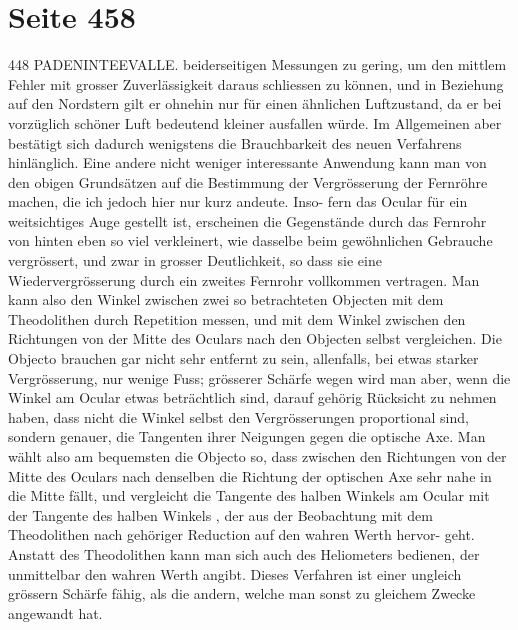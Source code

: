 \documentclass[10pt,a4paper]{article}
\begin{document}
\newpage
\section*{Seite 458}

448  PADENINTEEVALLE.
beiderseitigen  Messungen  zu  gering,  um  den  mittlem  Fehler  mit  grosser  Zuverlässigkeit  daraus  schliessen
zu  können,  und  in  Beziehung  auf  den  Nordstern  gilt  er  ohnehin  nur  für  einen  ähnlichen  Luftzustand,
da  er  bei  vorzüglich  schöner  Luft  bedeutend  kleiner  ausfallen  würde.  Im  Allgemeinen  aber  bestätigt
sich  dadurch  wenigstens  die  Brauchbarkeit  des  neuen  Verfahrens  hinlänglich.
Eine  andere  nicht  weniger  interessante  Anwendung  kann  man  von  den  obigen  Grundsätzen  auf
die  Bestimmung  der  Vergrösserung  der  Fernröhre  machen,  die  ich  jedoch  hier  nur  kurz  andeute.  Inso-
fern das  Ocular  für  ein  weitsichtiges  Auge  gestellt  ist,  erscheinen  die  Gegenstände  durch  das  Fernrohr
von  hinten  eben  so  viel  verkleinert,  wie  dasselbe  beim  gewöhnlichen  Gebrauche  vergrössert,  und  zwar
in  grosser  Deutlichkeit,  so  dass  sie  eine  Wiedervergrösserung  durch  ein  zweites  Fernrohr  vollkommen
vertragen.  Man  kann  also  den  Winkel  zwischen  zwei  so  betrachteten  Objecten  mit  dem  Theodolithen
durch  Repetition  messen,  und  mit  dem  Winkel  zwischen  den  Richtungen  von  der  Mitte  des  Oculars
nach  den  Objecten  selbst  vergleichen.  Die  Objecto  brauchen  gar  nicht  sehr  entfernt  zu  sein,  allenfalls,
bei  etwas  starker  Vergrösserung,  nur  wenige  Fuss;  grösserer  Schärfe  wegen  wird  man  aber,  wenn  die
Winkel  am  Ocular  etwas  beträchtlich  sind,  darauf  gehörig  Rücksicht  zu  nehmen  haben,  dass  nicht  die
Winkel  selbst  den  Vergrösserungen  proportional  sind,  sondern  genauer,  die  Tangenten  ihrer  Neigungen
gegen  die  optische  Axe.  Man  wählt  also  am  bequemsten  die  Objecto  so,  dass  zwischen  den  Richtungen
von  der  Mitte  des  Oculars  nach  denselben  die  Richtung  der  optischen  Axe  sehr  nahe  in  die  Mitte  fällt,
und  vergleicht  die  Tangente  des  halben  Winkels  am  Ocular  mit  der  Tangente  des  halben  Winkels ,  der
aus  der  Beobachtung  mit  dem  Theodolithen  nach  gehöriger  Reduction  auf  den  wahren  Werth  hervor-
geht. Anstatt  des  Theodolithen  kann  man  sich  auch  des  Heliometers  bedienen,  der  unmittelbar  den
wahren  Werth  angibt.  Dieses  Verfahren  ist  einer  ungleich  grössern  Schärfe  fähig,  als  die  andern,  welche
man  sonst  zu  gleichem  Zwecke  angewandt  hat.
\end{document}
